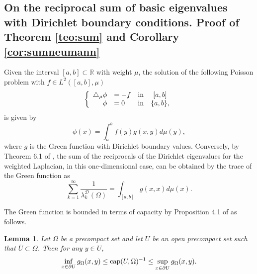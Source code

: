 \documentclass{amsart}
\newtheorem{lemma}[theorem]{Lemma}
\theoremstyle{definition}
\theoremstyle{remark}
\numberwithin{equation}{section}
\begin{document}
\subsection{On the reciprocal sum of basic eigenvalues with Dirichlet boundary conditions. Proof of Theorem \ref{teo:sum} and Corollary \ref{cor:sumneumann}}
Given the interval $[a,b]\subset \mathbb{R} $ with weight $\mu$, the solution of the following Poisson problem with $f\in L^2([a,b],\mu)$
$$
\left\lbrace 
\begin{array}{rllc}
\triangle_\mu\phi &=-f&{\rm in}&[a,b] \\
 \phi&=0 &{\rm in}&\{a,b\}, 
\end{array}
\right.
$$
is given by 
$$
\phi(x)=\int_a^bf(y)g(x,y)d\mu(y),
$$
where $g$ is the Green function with Dirichlet boundary values. Conversely, by Theorem 6.1 of \cite{bessa2016}, the sum of the reciprocals of the Dirichlet eigenvalues for the weighted Laplacian, in this one-dimensional case, can be obtained by the trace of the Green function as
 $$
\sum_{k=1}^{\infty}\frac{1}{\lambda_k^{\mathcal{D}}(\Omega)}=\int_{[a,b]}g(x,x)d\mu(x).
$$

The Green function is bounded in terms of capacity by Proposition 4.1 of \cite{GriExp} as follows.

\begin{lemma}\label{grygcap}
Let $\Omega$ be a precompact set and let $U$ be an open precompact set such that $\overline U\subset \Omega$. Then for any $y\in U$,
 $$
\inf_{x\in \partial U} g_\Omega(x,y)\leq {\rm cap}(U, \Omega)^{-1}\leq \sup_{x\in \partial U} g_\Omega(x,y). 
 $$
\end{lemma}
\end{document}
